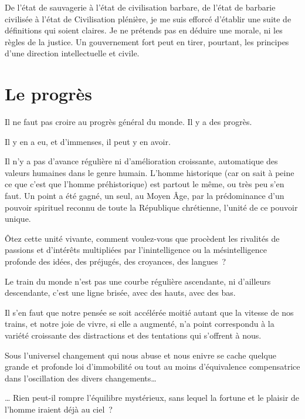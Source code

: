 \documentclass[french,twoside]{book} %
\newcommand{\astermono}{\medskip\centerline{\color{rubric}\large\selectfont{\syms ✻}}\medskip\par}%
\begin{document}
\noindent De l’état de sauvagerie à l’état de civilisation barbare, de l’état de barbarie civilisée à l’état de Civilisation plénière, je me suis efforcé d’établir une suite de définitions qui soient claires. Je ne prétends pas en déduire une morale, ni les règles de la justice. Un gouvernement fort peut en tirer, pourtant, les principes d’une direction intellectuelle et civile.
\section[Le progrès]{Le progrès}
\noindent Il ne faut pas croire au progrès général du monde. Il y a des progrès.\par
Il y en a eu, et d’immenses, il peut y en avoir.\par
Il n’y a pas d’avance régulière ni d’amélioration croissante, automatique des valeurs humaines dans le genre humain. L’homme historique (car on sait à peine ce que c’est que l’homme préhistorique) est partout le même, ou très peu s’en faut. Un point a été gagné, un seul, au Moyen Âge, par la prédominance d’un pouvoir spirituel reconnu de toute la République chrétienne, l’unité de ce pouvoir unique.\par
Ôtez cette unité vivante, comment voulez-vous que procèdent les rivalités de passions et d’intérêts multipliées par l’inintelligence ou la mésintelligence profonde des idées, des préjugés, des croyances, des langues ?\par
Le train du monde n’est pas une courbe régulière ascendante, ni d’ailleurs descendante, c’est une ligne brisée, avec des hauts, avec des bas.\par

\astermono

\noindent Il s’en faut que notre pensée se soit accélérée moitié autant que la vitesse de nos trains, et notre joie de vivre, si elle a augmenté, n’a point correspondu à la variété croissante des distractions et des tentations qui s’offrent à nous.\par
Sous l’universel changement qui nous abuse et nous enivre se cache quelque grande et profonde loi d’immobilité ou tout au moins d’équivalence compensatrice dans l’oscillation des divers changements…\par
… Rien peut-il rompre l’équilibre mystérieux, sans lequel la fortune et le plaisir de l’homme iraient déjà au ciel ?\par

\astermono
\end{document}
